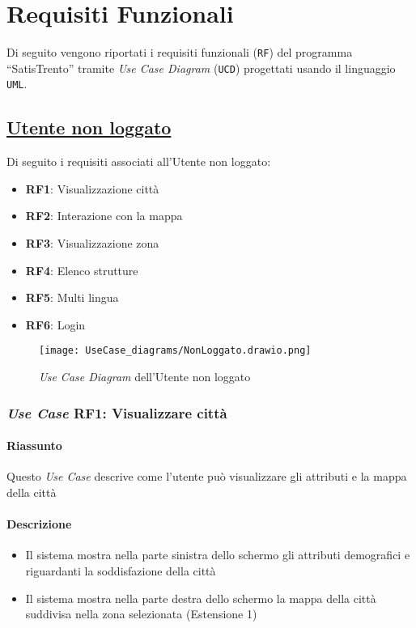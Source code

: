 \chapter{Requisiti Funzionali}
\label{ch:requisitiFunzionali}

Di seguito vengono riportati i requisiti funzionali (\texttt{RF}) del programma ``SatisTrento'' tramite \textit{Use Case Diagram} (\texttt{UCD}) progettati usando il linguaggio \texttt{UML}.

\section{\underline{Utente non loggato}}
    Di seguito i requisiti associati all'Utente non loggato:
    \begin{itemize}
        \item \textbf{RF1}: Visualizzazione città
        \item \textbf{RF2}: Interazione con la mappa
        \item \textbf{RF3}: Visualizzazione zona
        \item \textbf{RF4}: Elenco strutture
        \item \textbf{RF5}: Multi lingua
        \item \textbf{RF6}: Login
    \end{itemize}
    \begin{figure}[H]
        \centering
        \texttt{[image: UseCase\_diagrams/NonLoggato.drawio.png]}
        \caption{\textit{Use Case Diagram} dell'Utente non loggato}
    \end{figure}

    \subsection{\textit{Use Case} RF1: Visualizzare città}
        \subsubsection{Riassunto}
            Questo \textit{Use Case} descrive come l'utente può visualizzare gli attributi e la mappa della città
        \subsubsection{Descrizione}
            \begin{itemize}
                \item Il sistema mostra nella parte sinistra dello schermo gli attributi demografici e riguardanti la soddisfazione della città
                \item Il sistema mostra nella parte destra dello schermo la mappa della città suddivisa nella zona selezionata (Estensione 1)
            \end{itemize}
